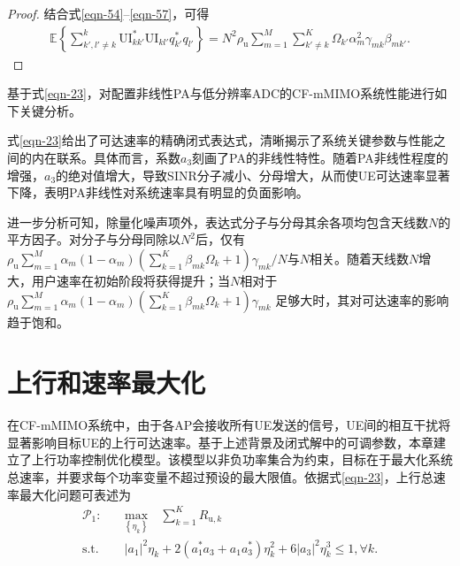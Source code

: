 \begin{proof}
结合式\eqref{eqn-54}--\eqref{eqn-57}，可得
\begin{equation}\begin{aligned}\mathbb{E}\left\{ {\mathop \sum \limits_{k',l' \ne k}^k \text{UI}_{kk'}^ * \text{UI}_{kl'}q_{k'}^ * {q_{l'}}} \right\} = {N^2}{\rho _\text{u}}\mathop \sum \limits_{m = 1}^M {\mathop \sum \limits_{k' \ne k}^K\Omega _{k'} \alpha _m^2{\gamma _{mk}}{\beta _{mk'}}}. \end{aligned}\end{equation}
\end{proof}
基于式\eqref{eqn-23}，对配置非线性PA与低分辨率ADC的CF-mMIMO系统性能进行如下关键分析。

式\eqref{eqn-23}给出了可达速率的精确闭式表达式，清晰揭示了系统关键参数与性能之间的内在联系。具体而言，系数$a_3$刻画了PA的非线性特性。随着PA非线性程度的增强，$a_3$的绝对值增大，导致SINR分子减小、分母增大，从而使UE可达速率显著下降，表明PA非线性对系统速率具有明显的负面影响。

进一步分析可知，除量化噪声项外，表达式分子与分母其余各项均包含天线数$N$的平方因子。对分子与分母同除以$N^2$后，仅有
${\rho _\text{u}}\mathop \sum \limits_{m = 1}^M {\alpha _m}(1 - {\alpha _m})\left( {\mathop \sum \limits_{k = 1}^K {\beta _{mk}}\Omega _k + 1} \right){\gamma _{mk}}/N$与$N$相关。随着天线数$N$增大，用户速率在初始阶段将获得提升；当$N$相对于
${\rho _\text{u}}\mathop \sum \limits_{m = 1}^M {\alpha _m}(1 - {\alpha _m})\left( {\mathop \sum \limits_{k = 1}^K {\beta _{mk}}\Omega _k + 1} \right){\gamma _{mk}}$
足够大时，其对可达速率的影响趋于饱和。

\section{上行和速率最大化}

在CF-mMIMO系统中，由于各AP会接收所有UE发送的信号，UE间的相互干扰将显著影响目标UE的上行可达速率。基于上述背景及闭式解中的可调参数，本章建立了上行功率控制优化模型。该模型以非负功率集合为约束，目标在于最大化系统总速率，并要求每个功率变量不超过预设的最大限值。依据式\eqref{eqn-23}，上行总速率最大化问题可表述为
\begin{align} \label{P1}
\mathcal{P}_1:& \quad \underset{\left \{ \eta _k \right \} }{\text{max}} \quad  {\sum_{k=1}^{K}} R_{\text{u},k}\\
\text{s.t.}&\quad {\left| {{a_1}} \right|^2}{\eta _k} + 2(a_1^ * {a_3} + {a_1}a_3^ * )\eta _k^2 + 6{\left| {{a_3}} \right|^2}\eta _k^3 \le 1, \forall k.
\end{align}

